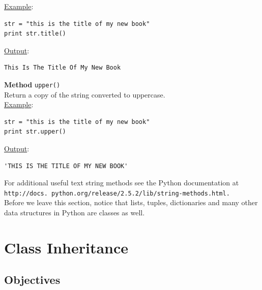 \noindent
\underline{Example}:
\begin{verbatim}
str = "this is the title of my new book"
print str.title()
\end{verbatim}
\underline{Output}:
\begin{verbatim}
This Is The Title Of My New Book
\end{verbatim}
\vspace{4mm}

\noindent
{\bf Method} {\tt upper()}\\
Return a copy of the string converted to uppercase.\\

\noindent
\underline{Example}:
\begin{verbatim}
str = "this is the title of my new book"
print str.upper()
\end{verbatim}
\underline{Output}:
\begin{verbatim}
'THIS IS THE TITLE OF MY NEW BOOK'
\end{verbatim}
\vspace{4mm}

\noindent
For additional useful text string methods see the Python documentation at 
{\tt http://docs. python.org/release/2.5.2/lib/string-methods.html.} \\

\noindent
Before we
leave this section, notice that lists, tuples, dictionaries and many other 
data structures in Python are classes as well.



\section{Class Inheritance}

\subsection{Objectives}

